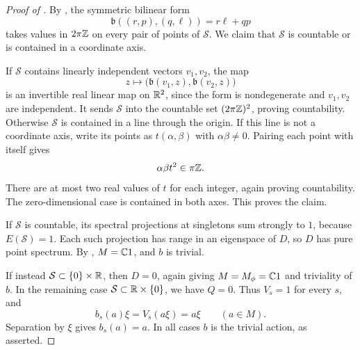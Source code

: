 \begin{proof}[Proof of ]
By , the symmetric bilinear form
\[
 \mathfrak b((r,p),(q,\ell))=r\ell+qp
\]
takes values in $2\pi\mathbb Z$ on every pair of points of $\mathcal S$. We claim
that $\mathcal S$ is countable or is contained in a coordinate axis.

If $\mathcal S$ contains linearly independent vectors $v_1,v_2$, the map
\[
 z\longmapsto\bigl(\mathfrak b(v_1,z),\mathfrak b(v_2,z)\bigr)
\]
is an invertible real linear map on $\mathbb R^2$, since the form is nondegenerate
and $v_1,v_2$ are independent. It sends $\mathcal S$ into the
countable set $(2\pi\mathbb Z)^2$, proving countability. Otherwise $\mathcal S$
is contained in a line through the origin. If this line is not a coordinate
axis, write its points as $t(\alpha,\beta)$ with $\alpha\beta\neq0$.
Pairing each point with itself gives
\[
 \alpha\beta t^2\in\pi\mathbb Z.
\]
There are at most two real values of $t$ for each integer, again proving
countability. The zero-dimensional case is contained in both axes. This
proves the claim.

If $\mathcal S$ is countable, its spectral projections at singletons sum
strongly to $1$, because $E(\mathcal S)=1$. Each such projection has range
in an eigenspace of $D$, so $D$ has pure point spectrum. By
, $M=\mathbb C1$, and $b$ is trivial.

If instead $\mathcal S\subset\{0\}\times\mathbb R$, then $D=0$, again giving
$M=M_\phi=\mathbb C1$ and triviality of $b$. In the remaining case
$\mathcal S\subset\mathbb R\times\{0\}$, we have $Q=0$. Thus $V_s=1$ for every
$s$, and
\[
 b_s(a)\xi=V_s(a\xi)=a\xi\qquad(a\in M).
\]
Separation by $\xi$ gives $b_s(a)=a$. In all cases $b$ is the trivial action,
as asserted.
\end{proof}
